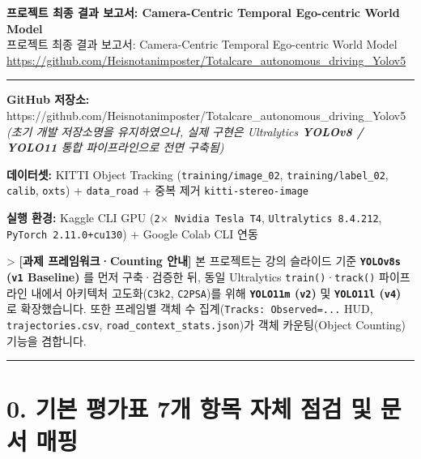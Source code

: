 \documentclass[10.5pt,a4paper]{article}
\begin{document}
\begin{center}
{\LARGE\bfseries 프로젝트 최종 결과 보고서: Camera-Centric Temporal Ego-centric World Model}\\[6pt]
{\normalsize\color{gray} 프로젝트 최종 결과 보고서: Camera-Centric Temporal Ego-centric World Model}\\[4pt]
{\small\href{https://github.com/Heisnotanimposter/Totalcare_autonomous_driving_Yolov5}{https://github.com/Heisnotanimposter/Totalcare\_autonomous\_driving\_Yolov5}}
\end{center}
\vspace{4pt}
\hrule
\vspace{8pt}

\textbf{GitHub 저장소:} https:\allowbreak{}/\allowbreak{}/\allowbreak{}github.\allowbreak{}com/\allowbreak{}Heisnotanimposter/\allowbreak{}Totalcare\_\allowbreak{}autonomous\_\allowbreak{}driving\_\allowbreak{}Yolov5 \textit{(초기 개발 저장소명을 유지하였으나, 실제 구현은 Ultralytics \textbf{YOLOv8 / YOLO11} 통합 파이프라인으로 전면 구축됨)}

\textbf{데이터셋:} KITTI Object Tracking (\texttt{training/\allowbreak{}image\_\allowbreak{}02}, \texttt{training/\allowbreak{}label\_\allowbreak{}02}, \texttt{calib}, \texttt{oxts}) + \texttt{data\_\allowbreak{}road} + 중복 제거 \texttt{kitti-\allowbreak{}stereo-\allowbreak{}image}

\textbf{실행 환경:} Kaggle CLI GPU (\texttt{2$\times$ Nvidia Tesla T4}, \texttt{Ultralytics 8.\allowbreak{}4.\allowbreak{}212}, \texttt{PyTorch 2.\allowbreak{}11.\allowbreak{}0+cu130}) + Google Colab CLI 연동


> \textbf{[과제 프레임워크·Counting 안내]} 본 프로젝트는 강의 슬라이드 기준 \textbf{\texttt{YOLOv8s} (\texttt{v1} Baseline)} 를 먼저 구축·검증한 뒤, 동일 Ultralytics \texttt{train()}·\texttt{track()} 파이프라인 내에서 아키텍처 고도화(\texttt{C3k2}, \texttt{C2PSA})를 위해 \textbf{\texttt{YOLO11m} (\texttt{v2})} 및 \textbf{\texttt{YOLO11l} (\texttt{v4})} 로 확장했습니다. 또한 프레임별 객체 수 집계(\texttt{Tracks:\allowbreak{} Observed=.\allowbreak{}.\allowbreak{}.\allowbreak{}} HUD, \texttt{trajectories.\allowbreak{}csv}, \texttt{road\_\allowbreak{}context\_\allowbreak{}stats.\allowbreak{}json})가 객체 카운팅(Object Counting) 기능을 겸합니다.


\par\noindent\rule{\textwidth}{0.4pt}\par\medskip

\section{0. 기본 평가표 7개 항목 자체 점검 및 문서 매핑}
\end{document}
